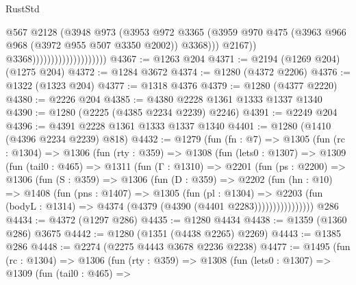 \begin{lexlean}{RustStd}
\begin{coremodule}
                                                @567
                                                @2128
                                                (@3948
                                                  @973
                                                  (@3953
                                                    @972
                                                    @3365
                                                    (@3959
                                                      @970
                                                      @475
                                                      (@3963
                                                        @966
                                                        @968
                                                        (@3972 @955 @507 @3350 @2002))
                                                      @3368)))
                                                @2167))
                                            @3368))))))))))))))))))))
@4367 := @1263 @204
@4371 := @2194 (@1269 @204) (@1275 @204)
@4372 := @1284 @3672
@4374 := @1280 (@4372 @2206)
@4376 := @1322 (@1323 @204)
@4377 := @1318 @4376
@4379 := @1280 (@4377 @2220)
@4380 := @2226 @204
@4385 := @4380 @2228 @1361 @1333 @1337 @1340
@4390 := @1280 (@2225 (@4385 @2234 @2239) @2246)
@4391 := @2249 @204
@4396 := @4391 @2228 @1361 @1333 @1337 @1340
@4401 := @1280 (@1410 (@4396 @2234 @2239) @818)
@4432 := @1279
    (fun (fn : @7) =>
    @1305
      (fun (rc : @1304) =>
      @1306
        (fun (rty : @359) =>
        @1308
          (fun (lets0 : @1307) =>
          @1309
            (fun (tail0 : @465) =>
            @1311
              (fun (Γ : @1310) =>
              @2201
                (fun (ps : @2200) =>
                @1306
                  (fun (S : @359) =>
                  @1306
                    (fun (D : @359) =>
                    @2202
                      (fun (hn : @10) =>
                      @1408
                        (fun (pns : @1407) =>
                        @1305
                          (fun (pl : @1304) =>
                          @2203
                            (fun (bodyL : @1314) => @4374 (@4379 (@4390 (@4401 @2283))))))))))))))))
    @286
@4434 := @4372 (@1297 @286)
@4435 := @1280 @4434
@4438 := @1359 (@1360 @286) @3675
@4442 := @1280 (@1351 (@4438 @2265) @2269)
@4443 := @1385 @286
@4448 := @2274 (@2275 @4443 @3678 @2236 @2238)
@4477 := @1495
    (fun (rc : @1304) =>
    @1306
      (fun (rty : @359) =>
      @1308
        (fun (lets0 : @1307) =>
        @1309
          (fun (tail0 : @465) =>

\end{coremodule}
\end{lexlean}
